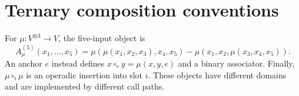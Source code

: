\section{Ternary composition conventions}

For $\mu:V^{\otimes 3}\to V$, the five-input object is
\[
A^{(5)}_\mu(x_1,\ldots,x_5)=\mu(\mu(x_1,x_2,x_3),x_4,x_5)-\mu(x_1,x_2,\mu(x_3,x_4,x_5)).
\]
An anchor $e$ instead defines $x\circ_e y=\mu(x,y,e)$ and a binary associator. Finally, $\mu\circ_i\mu$ is an operadic insertion into slot $i$. These objects have different domains and are implemented by different call paths.



